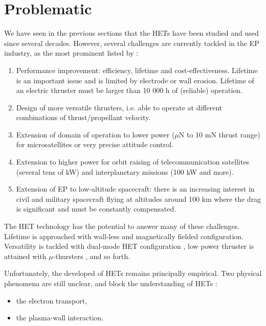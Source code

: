 
\section*{Problematic}
\label{sec-problematic}

We have seen in the previous sections that the \ac{HET}s have been studied and used since several decades.
However, several challenges are currently tackled in the \ac{EP} industry, as the most prominent listed by \citet{samukawa2012} :
\begin{enumerate}
  \item Performance improvement: efficiency, lifetime and cost-effectiveness.
   Lifetime is an important issue and is limited by electrode or wall erosion.
   Lifetime of an electric thruster must be larger than 10 000 h of (reliable) operation.
   \item  Design of more versatile thrusters, i.e. able to operate at different combinations of thrust/propellant velocity.
   \item  Extension of domain of operation to lower power ($\mu$N to 10 mN thrust range) for microsatellites or very precise attitude control.
   \item  Extension to higher power for orbit raising of telecommunication satellites (several tens of kW) and    interplanetary missions (100 kW and more).
   \item Extension of EP to low-altitude spacecraft: there is an increasing interest in civil and military spacecraft flying  at altitudes around 100 km where the drag is significant and must be constantly compensated.
\end{enumerate}

The \ac{HET} technology has the potential to answer many of these challenges.
Lifetime is approached with wall-less and magnetically fielded configuration.
Versatility is tackled with dual-mode \ac{HET} configuration \citep{boniface2017}, low power thruster is attained with $\mu$-thursters \citep{lascombes2018}, and so forth.

Unfortunately, the developed of \ac{HET}s remains principally empirical. 
Two physical phenomena are still unclear, and block the understanding of \ac{HET}s \citep{samukawa2012,adamovich2017}:
\begin{itemize}
  \item the electron transport,
  \item the plasma-wall interaction.
\end{itemize}

